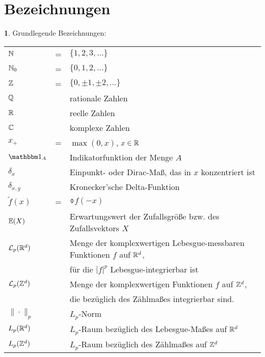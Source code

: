 \documentclass[
 a4paper,
 12pt,
 parskip=half
 ]{scrreprt}
\theoremstyle{plain}
\theoremstyle{definition}
\newtheorem{prgp}[thm]{} %
\numberwithin{equation}{section}
\begin{document}
\section{Bezeichnungen}
\begin{prgp}
  Grundlegende Bezeichnungen:
  
  \begin{tabular}{lcl}
    $\mathbb{N}$ & = & $\{1,2,3, \ldots\}$ \\
    $\mathbb{N}_0$ & = & $\{0,1,2, \ldots\}$ \\
    $\mathbb{Z}$ & = & $\{ 0, \pm 1, \pm 2, \ldots \}$ \\
    $\mathbb{Q}$ & & rationale Zahlen \\
    $\mathbb{R}$ & & reelle Zahlen \\
    $\mathbb{C}$ & & komplexe Zahlen \\
    $x_+$ & = & $\max(0,x)$, $x \in \mathbb{R}$ \\
    $\ind_A$ & & Indikatorfunktion der Menge $A$ \\
    $\delta_x$ & & Einpunkt- oder Dirac-Maß, das in $x$ konzentriert ist \\
    $\delta_{x,y}$ & & Kronecker'sche Delta-Funktion \\
    $\tilde{f}(x)$ & = & $\obar{f(-x)}$ \\
    $\mathbb{E}(X)$ & & Erwartungswert der Zufallsgröße bzw. des Zufallsvektors $X$ \\
    $\mathcal{L}_p(\mathbb{R}^d)$ & & Menge der komplexwertigen Lebesgue-messbaren
                           Funktionen $f$ auf $\mathbb{R}^d$, \\
           & & für die $|f|^p$ Lebesgue-integrierbar ist \\
    $\mathcal{L}_p(\mathbb{Z}^d)$ & & Menge der komplexwertigen Funktionen $f$
                              auf $\mathbb{Z}^d$, \\
           & & die bezüglich des Zählmaßes integrierbar sind. \\
    $\| \cdot \|_p$ & & $L_p$-Norm \\
    $L_p(\mathbb{R}^d)$ & & $L_p$-Raum bezüglich des Lebesgue-Maßes auf $\mathbb{R}^d$ \\
    $L_p(\mathbb{Z}^d)$ & & $L_p$-Raum bezüglich des Zählmaßes auf $\mathbb{Z}^d$
  \end{tabular}
\end{prgp}
\end{document}
